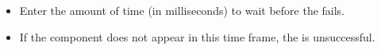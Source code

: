 
\begin{itemize}
\item Enter the amount of time (in milliseconds) to wait before the \gdstep{} fails.
\item If the component does not appear in this time frame, the \gdstep{} is unsuccessful.
\end{itemize}
